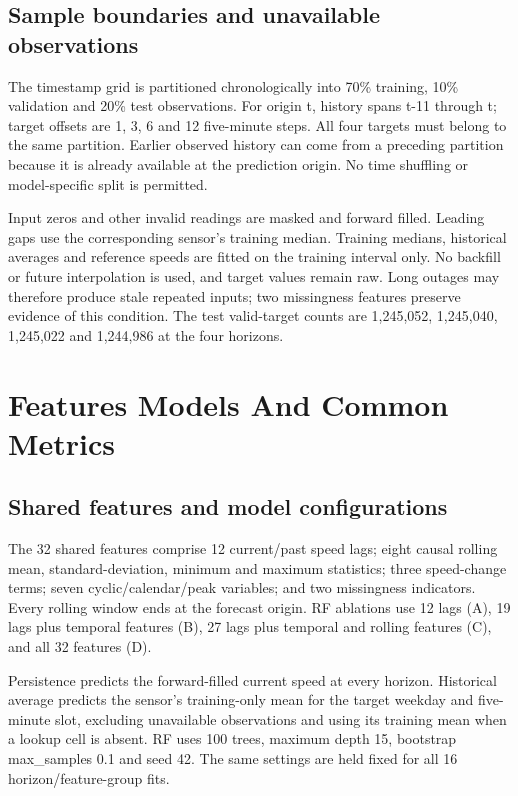 \documentclass[conference]{IEEEtran}
\begin{document}
\subsection{Sample boundaries and unavailable observations}
The timestamp grid is partitioned chronologically into 70\% training, 10\% validation and 20\% test observations. For origin t, history spans t-11 through t; target offsets are 1, 3, 6 and 12 five-minute steps. All four targets must belong to the same partition. Earlier observed history can come from a preceding partition because it is already available at the prediction origin. No time shuffling or model-specific split is permitted.

Input zeros and other invalid readings are masked and forward filled. Leading gaps use the corresponding sensor's training median. Training medians, historical averages and reference speeds are fitted on the training interval only. No backfill or future interpolation is used, and target values remain raw. Long outages may therefore produce stale repeated inputs; two missingness features preserve evidence of this condition. The test valid-target counts are 1,245,052, 1,245,040, 1,245,022 and 1,244,986 at the four horizons.

\section{Features Models And Common Metrics}
\subsection{Shared features and model configurations}
The 32 shared features comprise 12 current/past speed lags; eight causal rolling mean, standard-deviation, minimum and maximum statistics; three speed-change terms; seven cyclic/calendar/peak variables; and two missingness indicators. Every rolling window ends at the forecast origin. RF ablations use 12 lags (A), 19 lags plus temporal features (B), 27 lags plus temporal and rolling features (C), and all 32 features (D).

Persistence predicts the forward-filled current speed at every horizon. Historical average predicts the sensor's training-only mean for the target weekday and five-minute slot, excluding unavailable observations and using its training mean when a lookup cell is absent. RF uses 100 trees, maximum depth 15, bootstrap max\_samples 0.1 and seed 42. The same settings are held fixed for all 16 horizon/feature-group fits.
\end{document}
